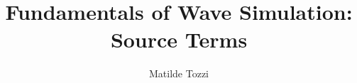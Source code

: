 \documentclass[journal,onecolumn]{IEEEtran}
\begin{document}
%
\title{Fundamentals of Wave Simulation: \\ Source Terms}
%
%
%

\author{Matilde Tozzi}

% 
%
\end{document}
